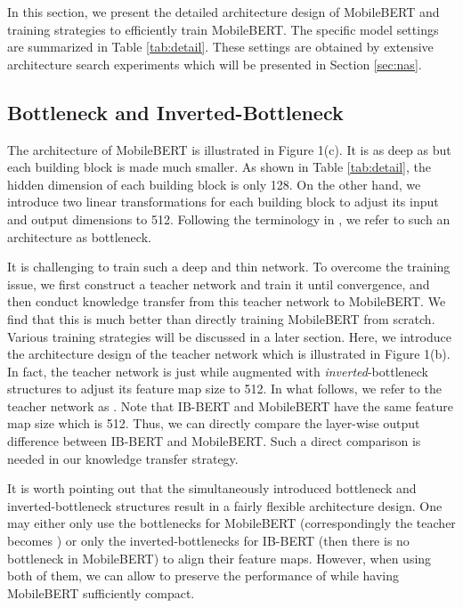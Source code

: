 \documentclass[11pt,a4paper]{article}
\begin{document}
In this section, we present the detailed architecture design of MobileBERT and training strategies to efficiently train MobileBERT. The specific model settings are summarized in Table \ref{tab:detail}. These settings are obtained by extensive architecture search experiments which will be presented in Section \ref{sec:nas}.









\subsection{Bottleneck and Inverted-Bottleneck}



The architecture of MobileBERT is illustrated in Figure 1(c). It is as deep as    but each building block is made much smaller. As shown in Table \ref{tab:detail}, the hidden dimension of each building block is only 128.  On the other hand, we introduce two linear transformations for each building block to adjust its input and output dimensions to 512. Following the terminology in \citep{he2016deep}, we refer to such an architecture  as  bottleneck. 

It is challenging to train such a deep and thin network. To overcome the training issue, we first construct a teacher network and train it until convergence, and then conduct knowledge transfer from this teacher network to MobileBERT.  We find that this is much better than directly training MobileBERT from scratch. Various training strategies will be discussed in a later section. Here, we introduce the architecture design of the teacher network which is illustrated in Figure 1(b). In fact, the teacher network is just   while augmented with \emph{inverted}-bottleneck structures \citep{sandler2018mobilenetv2} to adjust its feature map size to 512. 
In what follows, we refer to the teacher network as .
Note that IB-BERT and MobileBERT have the same feature map size which is 512. Thus, we can directly compare the layer-wise output difference between IB-BERT and MobileBERT. Such a direct comparison is needed in our knowledge transfer strategy.

It is worth pointing out that the simultaneously introduced bottleneck and inverted-bottleneck structures result in a fairly flexible architecture design. One may either only use the bottlenecks for MobileBERT (correspondingly the teacher becomes ) or only the inverted-bottlenecks for IB-BERT (then there is no bottleneck in MobileBERT) to align their feature maps. However, when using both of them,  we can allow  to preserve the performance of  while having MobileBERT sufficiently compact.
\end{document}
